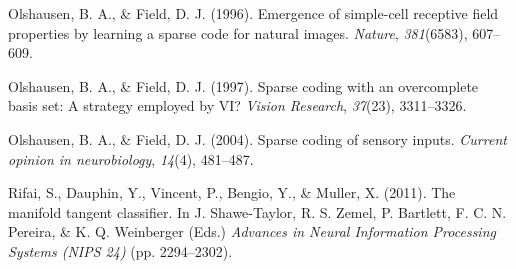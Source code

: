 \documentclass{article} %
\begin{document}
\begin{thebibliography}{100}
Olshausen, B. A., \& Field, D. J. (1996). 
\newblock Emergence of simple-cell receptive field properties by learning a sparse code for natural images. 
\newblock \emph{Nature}, \emph{381}(6583), 607--609.

Olshausen, B. A., \& Field, D. J. (1997). 
\newblock Sparse coding with an overcomplete basis set: A strategy employed by VI?
\newblock \emph{Vision Research}, \emph{37}(23), 3311--3326.

Olshausen, B. A., \& Field, D. J. (2004). 
\newblock Sparse coding of sensory inputs. 
\newblock \emph{Current opinion in neurobiology}, \emph{14}(4), 481--487.



Rifai, S., Dauphin, Y., Vincent, P., Bengio, Y., \& Muller, X. (2011). 
\newblock The manifold tangent classifier. 
\newblock In J. Shawe-Taylor, R. S. Zemel, P. Bartlett, F. C. N. Pereira, \& K. Q. Weinberger (Eds.) \emph{Advances in Neural Information Processing Systems (NIPS 24)} (pp. 2294--2302). %




\end{thebibliography}
\end{document}
